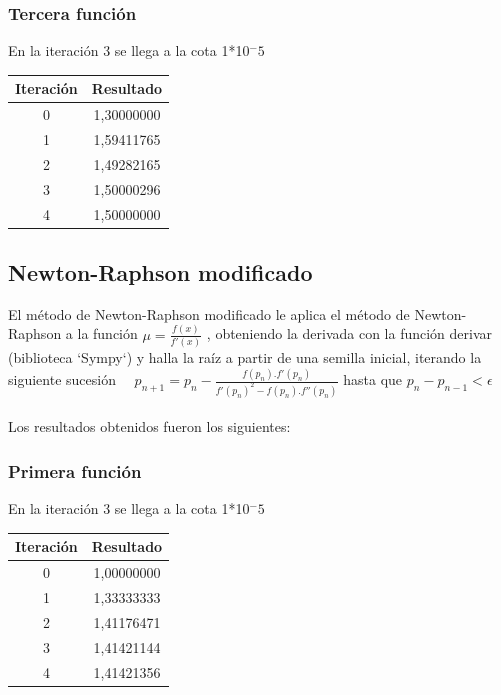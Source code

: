 \documentclass[titlepage,a4paper]{article}
\begin{document}
\subsubsection{Tercera función}\label{sec:NR3}
En la iteración 3 se llega a la cota 1*10$^-5$
\begin{center}
    \begin{tabular}{| c | c |}
    \hline
     Iteración & Resultado \\ \hline
        0     & 1,30000000 \\
        1     & 1,59411765 \\
        2     & 1,49282165 \\
        3     & 1,50000296 \\
        4     & 1,50000000 \\
    \hline
    \end{tabular}
\end{center}
\subsection{Newton-Raphson modificado}\label{sec:biseccion}

El método de Newton-Raphson modificado le aplica el método de Newton-Raphson a la función $\mu =\frac{f (x)}{f'(x)}$
, obteniendo la derivada con la función derivar (biblioteca `Sympy`) y halla la raíz a partir de una semilla inicial, iterando la siguiente sucesión
$
\quad p_{n+1}=p_n-\frac{f(p_n).f'(p_n)} {f'(p_n)^2-f(p_n).f''(p_n)}
 $ hasta que $
p_{n}-p_{n-1} < \mbox{$\epsilon$}
$
\\\\Los resultados obtenidos fueron los siguientes:
\subsubsection{Primera función}\label{sec:NRM1}
En la iteración 3 se llega a la cota 1*10$^-5$
\begin{center}
    \begin{tabular}{| c | c |}
    \hline
     Iteración & Resultado \\ \hline
        0     & 1,00000000 \\
        1     & 1,33333333 \\
        2     & 1,41176471 \\
        3     & 1,41421144 \\
        4     & 1,41421356 \\
    \hline
    \end{tabular}
\end{center}
\end{document}
